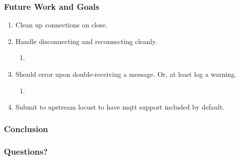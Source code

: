 \documentclass{beamer}
\begin{document}
\begin{frame}
    \frametitle{Future Work and Goals}
    \begin{enumerate}
        \item
            Clean up connections on close.
        \item
            Handle disconnecting and reconnecting cleanly.
            \begin{enumerate}
                \item
            \end{enumerate}
        \item
            Should error upon double-receiving a message. Or, at least log a
            warning.
            \begin{enumerate}
                \item
            \end{enumerate}
        \item
            Submit to upstream locust to have mqtt support included by default.
    \end{enumerate}
\end{frame}

\begin{frame}
    \frametitle{Conclusion}
\end{frame}

\begin{frame}
    \frametitle{Questions?}
\end{frame}
\end{document}
